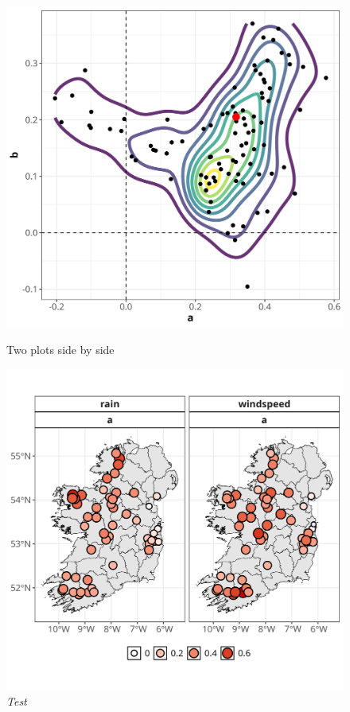 \documentclass{article}
\numberwithin{equation}{section}
\begin{document}
\begin{figure}[H]
\begin{minipage}{0.44\textwidth}
        \includegraphics[width=\textwidth]{plots/044_bootstrap_density.png}
        \label{fig:plot2}
    \end{minipage}
    \caption{Two plots side by side}
\end{figure}

\begin{figure}[H]
    \centering
    \includegraphics[width = 0.9\linewidth]{plots/045_alpha_map.png}
    \caption{\emph{Test}}
    \label{fig:04_alpha_map}
\end{figure}
\end{document}
